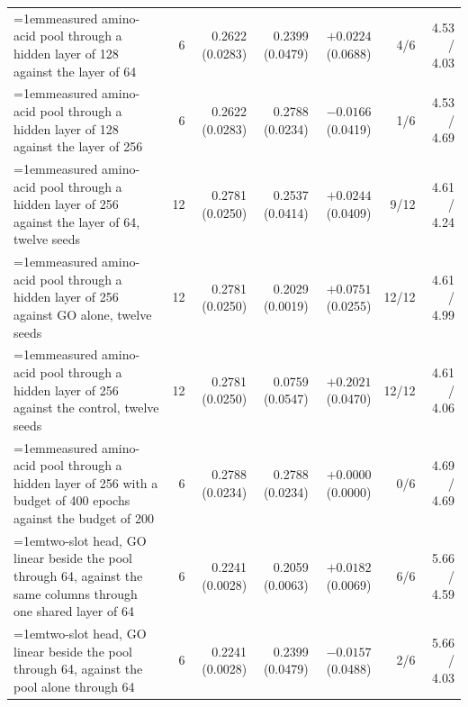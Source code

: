 \begin{table}[H]
\begin{tabular}{@{}>{\raggedright\hangindent=1em\hangafter=1\arraybackslash}p{78.5mm}rrrrrr@{}}
    measured amino-acid pool through a hidden layer of 128 against the layer of 64 & 6 & 0.2622 (0.0283) & 0.2399 (0.0479) & $+0.0224$ (0.0688) & 4/6 & 4.53 / 4.03 \\
    measured amino-acid pool through a hidden layer of 128 against the layer of 256 & 6 & 0.2622 (0.0283) & 0.2788 (0.0234) & $-0.0166$ (0.0419) & 1/6 & 4.53 / 4.69 \\
    measured amino-acid pool through a hidden layer of 256 against the layer of 64, twelve seeds & 12 & 0.2781 (0.0250) & 0.2537 (0.0414) & $+0.0244$ (0.0409) & 9/12 & 4.61 / 4.24 \\
    measured amino-acid pool through a hidden layer of 256 against GO alone, twelve seeds & 12 & 0.2781 (0.0250) & 0.2029 (0.0019) & $+0.0751$ (0.0255) & 12/12 & 4.61 / 4.99 \\
    measured amino-acid pool through a hidden layer of 256 against the control, twelve seeds & 12 & 0.2781 (0.0250) & 0.0759 (0.0547) & $+0.2021$ (0.0470) & 12/12 & 4.61 / 4.06 \\
    measured amino-acid pool through a hidden layer of 256 with a budget of 400 epochs against the budget of 200 & 6 & 0.2788 (0.0234) & 0.2788 (0.0234) & $+0.0000$ (0.0000) & 0/6 & 4.69 / 4.69 \\
    two-slot head, GO linear beside the pool through 64, against the same columns through one shared layer of 64 & 6 & 0.2241 (0.0028) & 0.2059 (0.0063) & $+0.0182$ (0.0069) & 6/6 & 5.66 / 4.59 \\
    two-slot head, GO linear beside the pool through 64, against the pool alone through 64 & 6 & 0.2241 (0.0028) & 0.2399 (0.0479) & $-0.0157$ (0.0488) & 2/6 & 5.66 / 4.03 \\
    \hline
  \end{tabular}
\end{table}

